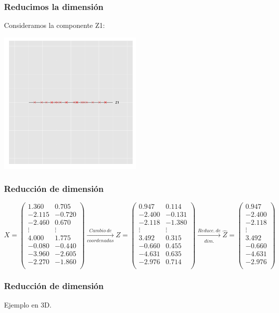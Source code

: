 \documentclass{beamer}
\begin{document}
  \begin{frame}\frametitle{Reducimos la dimensión}
  Consideramos la componente Z1:
 \begin{center}
   \includegraphics[height=7cm]{reduccion2d1d_4.png}
 \end{center}
  \end{frame}


 \begin{frame}\frametitle{Reducción de dimensión}
      \begin{overlayarea}{\textwidth}{6cm} 
{\tiny $$X=\left(\begin{array}{rr}
  1.360&  0.705\\
 -2.115& -0.720\\
 -2.460&  0.670\\
  \vdots & \vdots\\
  4.000&  1.775\\
 -0.080& -0.440\\
 -3.960& -2.605\\
 -2.270& -1.860\\
\end{array}\right) \xrightarrow[coordenadas]{Cambio\ de}
 Z=\left(\begin{array}{rr}
 0.947&   0.114\\
-2.400& -0.131\\
-2.118&  -1.380\\
  \vdots & \vdots\\
 3.492& 0.315\\
-0.660& 0.455\\
-4.631& 0.635\\
-2.976& 0.714\\
\end{array}\right) \xrightarrow[dim.]{Reducc.\ de}
 \hat{Z}=\left(\begin{array}{r}
 0.947   \\
-2.400   \\
-2.118   \\
  \vdots \\
 3.492   \\
-0.660   \\
-4.631   \\
-2.976   \\
\end{array}\right) 
 $$}

      \end{overlayarea}
 \end{frame}  
 \begin{frame}\frametitle{Reducción de dimensión}
Ejemplo en 3D.
 \end{frame}
\end{document}
